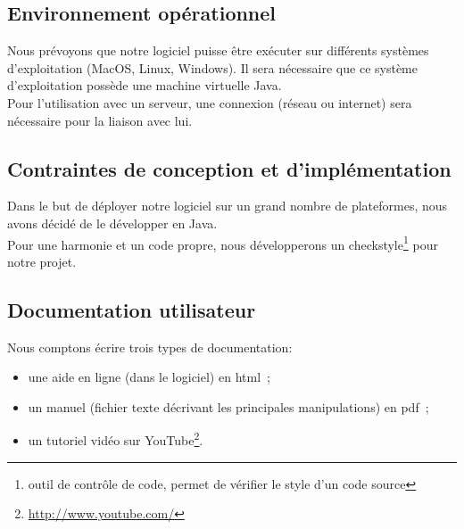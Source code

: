 	\subsection{Environnement opérationnel}

Nous prévoyons que notre logiciel puisse être exécuter sur différents systèmes d'exploitation (MacOS, Linux, Windows). Il sera nécessaire que ce système d'exploitation possède une machine virtuelle Java.
\\
Pour l'utilisation avec un serveur, une connexion (réseau ou internet) sera nécessaire pour la liaison avec lui.

	\subsection{Contraintes de conception et d'implémentation}

Dans le but de déployer notre logiciel sur un grand nombre de plateformes, nous avons décidé de le développer en Java.
\\
Pour une harmonie et un code propre, nous développerons un checkstyle\footnote{outil de contrôle de code, permet de vérifier le style d'un code source} pour notre projet.


	\subsection{Documentation utilisateur}

Nous comptons écrire trois types de documentation:

\begin{itemize}
\item une aide en ligne (dans le logiciel) en html~;
\item un manuel (fichier texte décrivant les principales manipulations) en pdf~;
\item un tutoriel vidéo sur YouTube\footnote{\url{http://www.youtube.com/}}.
\end{itemize}


